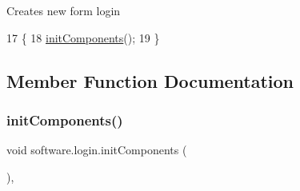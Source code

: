 Creates new form login 
\begin{DoxyCode}
17                    \{
18         \mbox{\hyperlink{classsoftware_1_1login_ac84cdac0e8dc0bb818680b78d1ff1241}{initComponents}}();
19     \}
\end{DoxyCode}


\subsection{Member Function Documentation}
\mbox{\label{classsoftware_1_1login_ac84cdac0e8dc0bb818680b78d1ff1241}} 
\subsubsection{\texorpdfstring{init\+Components()}{initComponents()}}
{\footnotesize\ttfamily void software.\+login.\+init\+Components (\begin{DoxyParamCaption}{ }\end{DoxyParamCaption})\hspace{0.3cm}{\ttfamily [inline]}, {\ttfamily [private]}}

